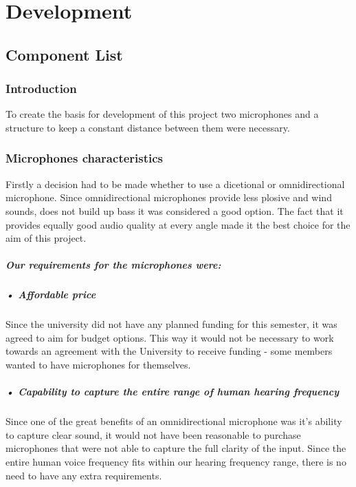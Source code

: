 \chapter{Development}\label{ch:development}
\section{Component List}
\subsection{Introduction}
To create the basis for development of this project two microphones and a structure to keep a constant distance between them were necessary.  

\subsection{Microphones characteristics}
Firstly a decision had to be made whether to use a dicetional or omnidirectional microphone. Since omnidirectional microphones provide less plosive and wind sounds, does not build up bass it was considered a good option. The fact that it provides equally good audio quality at every angle made it the best choice for the aim of this project.
\paragraph{Our requirements for the microphones were: \\}

\paragraph{• Affordable price\\}   
Since the university did not have any planned funding for this semester, it was agreed to aim for budget options. This way it would not be necessary to work towards an agreement with the University to receive funding - some members wanted to have microphones for themselves.
\paragraph{• Capability to capture the entire range of human hearing frequency\\}   
Since one of the great benefits of an omnidirectional microphone was it's ability to capture clear sound, it would not have been reasonable to purchase microphones that were not able to capture the full clarity of the input. Since the entire human voice frequency fits within our hearing frequency range, there is no need to have any extra requirements.
